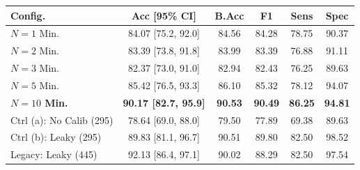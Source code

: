 \begin{tabular}{@{}lccccc@{}}
\toprule
\textbf{Config.} & \textbf{Acc [95\% CI]} & \textbf{B.Acc} & \textbf{F1} & \textbf{Sens} & \textbf{Spec} \\
\midrule
$N=1$ Min.  & 84.07 [75.2, 92.0] & 84.56 & 84.28 & 78.75 & 90.37 \\
$N=2$ Min.  & 83.39 [73.8, 91.8] & 83.99 & 83.39 & 76.88 & 91.11 \\
$N=3$ Min.  & 82.37 [73.0, 91.0] & 82.94 & 82.43 & 76.25 & 89.63 \\
$N=5$ Min.  & 85.42 [76.5, 93.3] & 86.10 & 85.32 & 78.12 & 94.07 \\
\textbf{$N=10$ Min.} & \textbf{90.17 [82.7, 95.9]} & \textbf{90.53} & \textbf{90.49} & \textbf{86.25} & \textbf{94.81} \\
\midrule
Ctrl (a): No Calib (295)  & 78.64 [69.0, 88.0] & 79.50 & 77.89 & 69.38 & 89.63 \\
Ctrl (b): Leaky (295)     & 89.83 [81.1, 96.7] & 90.51 & 89.80 & 82.50 & 98.52 \\
Legacy: Leaky (445)       & 92.13 [86.4, 97.1] & 90.02 & 88.29 & 82.50 & 97.54 \\
\bottomrule
\end{tabular}
